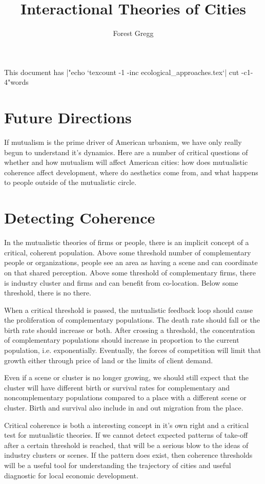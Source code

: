 \documentclass[12pt,draft,letter]{article}
\title{Interactional Theories of Cities}
\author{Forest Gregg}
\begin{document}
\maketitle
\noindent This document has \makeatletter\@@input|"echo `texcount -1 -inc ecological_approaches.tex`| cut -c1-4"\makeatother words




\section*{Future Directions}
If mutualism is the prime driver of American urbanism, we have only
really begun to understand it's dynamics. Here are a number of
critical questions of whether and how mutualism will affect American
cities: how does mutualistic coherence affect development, where do
aesthetics come from, and what happens to people outside of the
mutualistic circle.

\section*{Detecting Coherence}
In the mutualistic theories of firms or people, there is an implicit
concept of a critical, coherent population. Above some threshold
number of complementary people or organizations, people see an area as
having a scene and can coordinate on that shared perception. Above
some threshold of complementary firms, there is industry cluster and
firms and can benefit from co-location. Below some threshold, there is
no there.

When a critical threshold is passed, the mutualistic feedback loop
should cause the proliferation of complementary populations. The death
rate should fall or the birth rate should increase or both. After
crossing a threshold, the concentration of complementary populations
should increase in proportion to the current population,
i.e. exponentially. Eventually, the forces of competition will limit
that growth either through price of land or the limits of client
demand.

Even if a scene or cluster is no longer growing, we should still
expect that the cluster will have different birth or survival rates
for complementary and noncomplementary populations compared to a
place with a different scene or cluster. Birth and survival also
include in and out migration from the place.

Critical coherence is both a interesting concept in it's own right and
a critical test for mutualistic theories. If we cannot detect expected
patterns of take-off after a certain threshold is reached, that will
be a serious blow to the ideas of industry clusters or scenes. If the
pattern does exist, then coherence thresholds will be a useful tool
for understanding the trajectory of cities and useful diagnostic for
local economic development.
\end{document}
